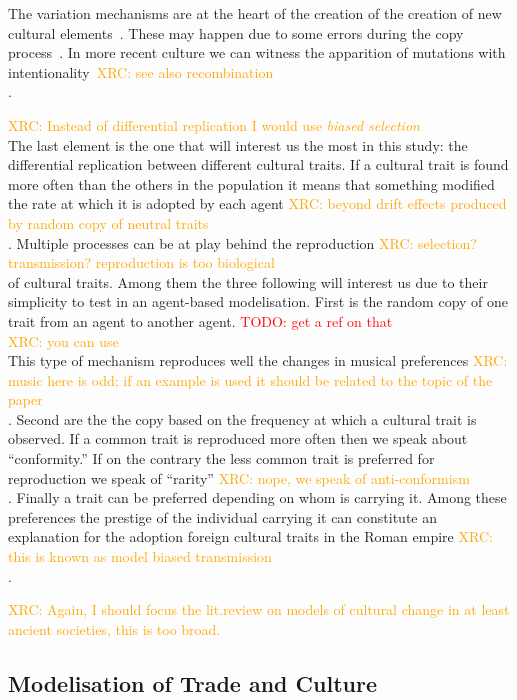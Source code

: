 \documentclass{wscpaperproc}
\newcommand{\memo}[2]{\textcolor{#1}{#2}}
\newcommand{\todo}[1]{\memo{red}{TODO: #1\\}}
\newcommand{\xrc}[1]{\memo{orange}{XRC: #1\\}}
\begin{document}
The variation mechanisms are at the heart of the creation of the creation of new cultural elements~\cite{obrien_variation_1990}. These may happen due to some errors during the copy process~\cite{schillinger_copying_2014}. In more recent culture we can witness the apparition of mutations with intentionality~\cite{ziman_technological_2003}\xrc{see also recombination \cite{sole_2013}}.

\xrc{Instead of differential replication I would use \emph{biased selection}}
The last element is the one that will interest us the most in this study: the differential replication between different cultural traits. If a cultural trait is found more often than the others in the population it means that something modified the rate at which it is adopted by each agent \xrc{beyond drift effects produced by random copy of neutral traits \cite{bentley_2004}}.
Multiple processes can be at play behind the reproduction \xrc{selection? transmission? reproduction is too biological} of cultural traits. Among them the three following will interest us due to their simplicity to test in an agent-based modelisation. First is the random copy of one trait from an agent to another agent. 
\todo{get a ref on that} \xrc{you can use \cite{bentley_2004}}
This type of mechanism reproduces well the changes in musical preferences \xrc{music here is odd; if an example is used it should be related to the topic of the paper}. Second are the the copy based on the frequency at which a cultural trait is observed. If a common trait is reproduced more often then we speak about ``conformity.'' If on the contrary the less common trait is preferred for reproduction we speak of ``rarity'' \xrc{nope, we speak of anti-conformism}. Finally a trait can be preferred depending on whom is carrying it. Among these preferences the prestige of the individual carrying it can constitute an explanation for the adoption foreign cultural traits in the Roman empire \xrc{this is known as model biased transmission}.

\xrc{Again, I should focus the lit.review on models of cultural change in at least ancient societies, this is too broad.}

\subsection{Modelisation of Trade and Culture}
\end{document}
